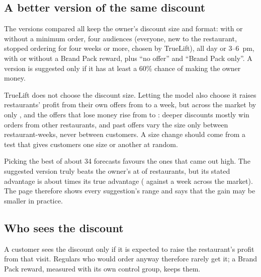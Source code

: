 \documentclass[conference]{IEEEtran}
\begin{document}
\subsection{A better version of the same discount}
The versions compared all keep the owner's discount size and format: with or without a minimum order,
four audiences (everyone, new to the restaurant, stopped ordering for four weeks or more, chosen by
TrueLift), all day or 3--6~pm, with or without a Brand Pack reward, plus ``no offer'' and ``Brand Pack
only''. A version is suggested only if it has at least a 60\% chance of making the owner money.

TrueLift does not choose the discount size. Letting the model also choose it raises restaurants'
profit from their own offers from  to  a week, but across the
market by only , and the offers that lose money rise from 
to : deeper discounts mostly win orders from other restaurants, and past offers vary
the size only between restaurant-weeks, never between customers. A size change should come from a
test that gives customers one size or another at random.

Picking the best of about 34 forecasts favours the ones that came out high. The suggested version
truly beats the owner's at  of restaurants, but its stated advantage is about
 times its true advantage ( against  a week
across the market). The page therefore shows every suggestion's range and says that the gain may be
smaller in practice.

\subsection{Who sees the discount}
A customer sees the discount only if it is expected to raise the restaurant's profit from that visit.
Regulars who would order anyway therefore rarely get it; a Brand Pack reward, measured with its own
control group, keeps them.
\end{document}
